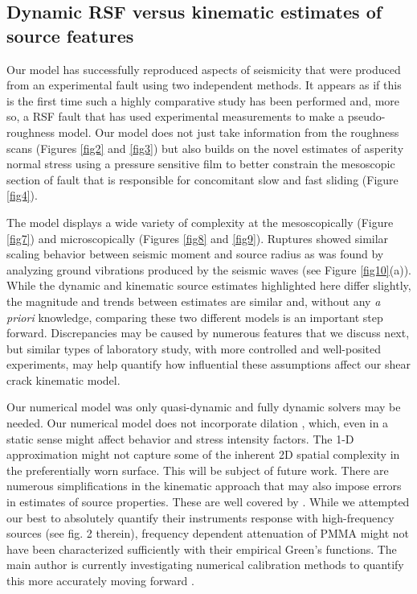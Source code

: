 \documentclass[draft]{agujournal2019}
\begin{document}
\subsection{Dynamic RSF versus kinematic estimates of source features}
Our model has successfully reproduced aspects of seismicity that were produced from an experimental fault using two independent methods.  It appears as if this is the first time such a highly comparative study has been performed and, more so, a RSF fault that has used experimental measurements to make a pseudo-roughness model. Our model does not just take information from the roughness scans (Figures \ref{fig2} and \ref{fig3}) but also builds on the novel estimates of asperity normal stress using a pressure sensitive film to better constrain the mesoscopic section of fault that is responsible for concomitant slow and fast sliding (Figure \ref{fig4}). 

The model displays a wide variety of complexity at the mesoscopically (Figure \ref{fig7}) and microscopically (Figures \ref{fig8} and \ref{fig9}). Ruptures showed similar scaling behavior between seismic moment and source radius as was found by analyzing ground vibrations produced by the seismic waves (see Figure \ref{fig10}(a)). While the dynamic and kinematic source estimates highlighted here differ slightly, the magnitude and trends between estimates are similar and, without any \textit{a priori} knowledge, comparing these two different models is an important step forward.  Discrepancies may be caused by numerous features that we discuss next, but similar types of laboratory study, with more controlled and well-posited experiments, may help quantify how influential these assumptions affect our shear crack kinematic model.

Our numerical model was only quasi-dynamic and fully dynamic solvers may be needed.  Our numerical model does not incorporate dilation \cite{Selvadurai2018}, which, even in a static sense might affect behavior and stress intensity factors. The 1-D approximation might not capture some of the inherent 2D spatial complexity in the preferentially worn surface.  This will be subject of future work. There are numerous simplifications in the kinematic approach that may also impose errors in estimates of source properties. These are well covered by . While we attempted our best to absolutely quantify their instruments response with high-frequency sources (see fig. 2 therein), frequency dependent attenuation of PMMA might not have been characterized sufficiently with their empirical Green's functions. The main author is currently investigating numerical calibration methods to quantify this more accurately moving forward \cite{Wu2020}.
\end{document}
